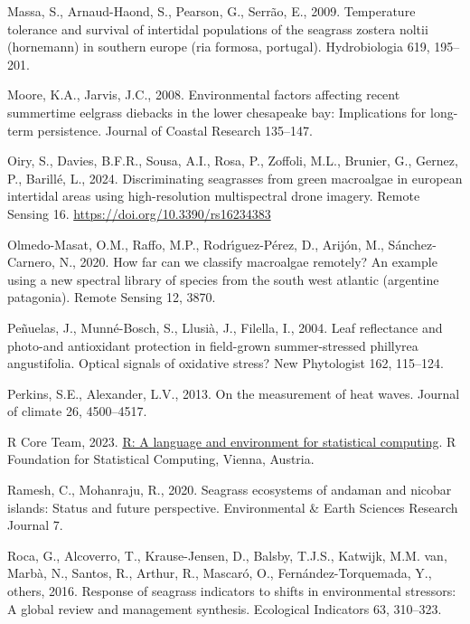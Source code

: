 \documentclass[
  letterpaper,
  DIV=11,
  numbers=noendperiod]{scrartcl}
\newlength{\cslhangindent}
\newenvironment{CSLReferences}[2] %
 {\begin{list}{}{%
  \setlength{\itemindent}{0pt}
  \setlength{\leftmargin}{0pt}
  \setlength{\parsep}{0pt}
  \ifodd #1
   \setlength{\leftmargin}{\cslhangindent}
   \setlength{\itemindent}{-1\cslhangindent}
  \fi
  \setlength{\itemsep}{#2\baselineskip}}}
 {\end{list}}
\begin{document}
\begin{CSLReferences}{1}{0}
Massa, S., Arnaud-Haond, S., Pearson, G., Serrão, E., 2009. Temperature
tolerance and survival of intertidal populations of the seagrass zostera
noltii (hornemann) in southern europe (ria formosa, portugal).
Hydrobiologia 619, 195--201.

Moore, K.A., Jarvis, J.C., 2008. Environmental factors affecting recent
summertime eelgrass diebacks in the lower chesapeake bay: Implications
for long-term persistence. Journal of Coastal Research 135--147.

Oiry, S., Davies, B.F.R., Sousa, A.I., Rosa, P., Zoffoli, M.L., Brunier,
G., Gernez, P., Barillé, L., 2024. Discriminating seagrasses from green
macroalgae in european intertidal areas using high-resolution
multispectral drone imagery. Remote Sensing 16.
\url{https://doi.org/10.3390/rs16234383}

Olmedo-Masat, O.M., Raffo, M.P., Rodrı́guez-Pérez, D., Arijón, M.,
Sánchez-Carnero, N., 2020. How far can we classify macroalgae remotely?
An example using a new spectral library of species from the south west
atlantic (argentine patagonia). Remote Sensing 12, 3870.

Peñuelas, J., Munné-Bosch, S., Llusià, J., Filella, I., 2004. Leaf
reflectance and photo-and antioxidant protection in field-grown
summer-stressed phillyrea angustifolia. Optical signals of oxidative
stress? New Phytologist 162, 115--124.

Perkins, S.E., Alexander, L.V., 2013. On the measurement of heat waves.
Journal of climate 26, 4500--4517.

R Core Team, 2023. \href{https://www.R-project.org/}{R: A language and
environment for statistical computing}. R Foundation for Statistical
Computing, Vienna, Austria.

Ramesh, C., Mohanraju, R., 2020. Seagrass ecosystems of andaman and
nicobar islands: Status and future perspective. Environmental \& Earth
Sciences Research Journal 7.

Roca, G., Alcoverro, T., Krause-Jensen, D., Balsby, T.J.S., Katwijk,
M.M. van, Marbà, N., Santos, R., Arthur, R., Mascaró, O.,
Fernández-Torquemada, Y., others, 2016. Response of seagrass indicators
to shifts in environmental stressors: A global review and management
synthesis. Ecological Indicators 63, 310--323.


\end{CSLReferences}
\end{document}
